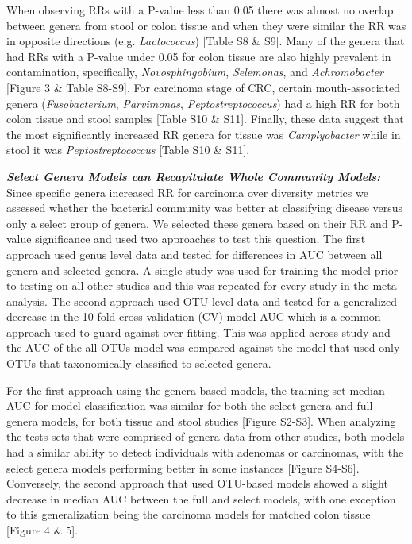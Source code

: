 \documentclass[12pt,]{article}
\begin{document}
When observing RRs with a P-value less than 0.05 there was almost no
overlap between genera from stool or colon tissue and when they were
similar the RR was in opposite directions (e.g. \emph{Lactococcus})
{[}Table S8 \& S9{]}. Many of the genera that had RRs with a P-value
under 0.05 for colon tissue are also highly prevalent in contamination,
specifically, \emph{Novosphingobium}, \emph{Selemonas}, and
\emph{Achromobacter} {[}Figure 3 \& Table S8-S9{]}. For carcinoma stage
of CRC, certain mouth-associated genera (\emph{Fusobacterium},
\emph{Parvimonas}, \emph{Peptostreptococcus}) had a high RR for both
colon tissue and stool samples {[}Table S10 \& S11{]}. Finally, these
data suggest that the most significantly increased RR genera for tissue
was \emph{Camplyobacter} while in stool it was \emph{Peptostreptococcus}
{[}Table S10 \& S11{]}.

\textbf{\emph{Select Genera Models can Recapitulate Whole Community
Models:}} Since specific genera increased RR for carcinoma over
diversity metrics we assessed whether the bacterial community was better
at classifying disease versus only a select group of genera. We selected
these genera based on their RR and P-value significance and used two
approaches to test this question. The first approach used genus level
data and tested for differences in AUC between all genera and selected
genera. A single study was used for training the model prior to testing
on all other studies and this was repeated for every study in the
meta-analysis. The second approach used OTU level data and tested for a
generalized decrease in the 10-fold cross validation (CV) model AUC
which is a common approach used to guard against over-fitting. This was
applied across study and the AUC of the all OTUs model was compared
against the model that used only OTUs that taxonomically classified to
selected genera.

For the first approach using the genera-based models, the training set
median AUC for model classification was similar for both the select
genera and full genera models, for both tissue and stool studies
{[}Figure S2-S3{]}. When analyzing the tests sets that were comprised of
genera data from other studies, both models had a similar ability to
detect individuals with adenomas or carcinomas, with the select genera
models performing better in some instances {[}Figure S4-S6{]}.
Conversely, the second approach that used OTU-based models showed a
slight decrease in median AUC between the full and select models, with
one exception to this generalization being the carcinoma models for
matched colon tissue {[}Figure 4 \& 5{]}.
\end{document}
